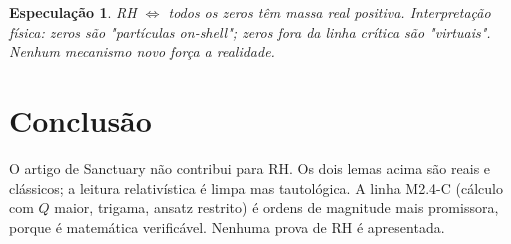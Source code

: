\documentclass[12pt,a4paper]{article}
\newtheorem{especulacao}{Especulação}
\begin{document}
\begin{especulacao}
RH $\iff$ todos os zeros têm massa real positiva. Interpretação física:
zeros são "partículas on-shell"; zeros fora da linha crítica são
"virtuais". Nenhum mecanismo novo força a realidade.
\end{especulacao}

\section{Conclusão}

O artigo de Sanctuary não contribui para RH. Os dois lemas acima são
reais e clássicos; a leitura relativística é limpa mas tautológica. A
linha M2.4-C (cálculo com $Q$ maior, trigama, ansatz restrito) é
ordens de magnitude mais promissora, porque é matemática verificável.
Nenhuma prova de RH é apresentada.
\end{document}
